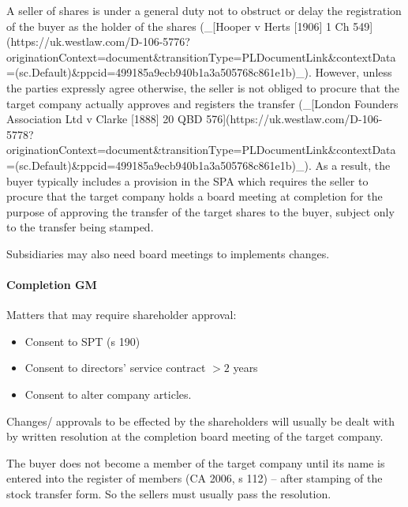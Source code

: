 \documentclass[
]{article}
\newenvironment{Shaded}{}{}
\newcommand{\NormalTok}[1]{#1}
\providecommand{\tightlist}{%
  \setlength{\itemsep}{0pt}\setlength{\parskip}{0pt}}
\begin{document}
\begin{Shaded}
\begin{Highlighting}[]
\NormalTok{A seller of shares is under a general duty not to obstruct or delay the registration of the buyer as the holder of the shares (\_[Hooper v Herts [1906] 1 Ch 549](https://uk.westlaw.com/D{-}106{-}5776?originationContext=document\&transitionType=PLDocumentLink\&contextData=(sc.Default)\&ppcid=499185a9ecb940b1a3a505768c861e1b)\_). However, unless the parties expressly agree otherwise, the seller is not obliged to procure that the target company actually approves and registers the transfer (\_[London Founders Association Ltd v Clarke [1888] 20 QBD 576](https://uk.westlaw.com/D{-}106{-}5778?originationContext=document\&transitionType=PLDocumentLink\&contextData=(sc.Default)\&ppcid=499185a9ecb940b1a3a505768c861e1b)\_). As a result, the buyer typically includes a provision in the SPA which requires the seller to procure that the target company holds a board meeting at completion for the purpose of approving the transfer of the target shares to the buyer, subject only to the transfer being stamped.}
\end{Highlighting}
\end{Shaded}

Subsidiaries may also need board meetings to implements changes.

\hypertarget{completion-gm}{%
\paragraph{Completion GM}\label{completion-gm}}

Matters that may require shareholder approval:

\begin{itemize}
\tightlist
\item
  Consent to SPT (s 190)
\item
  Consent to directors' service contract \(> 2\) years
\item
  Consent to alter company articles.
\end{itemize}

Changes/ approvals to be effected by the shareholders will usually be
dealt with by written resolution at the completion board meeting of the
target company.

\begin{Shaded}
\begin{Highlighting}[]
\NormalTok{The buyer does not become a member of the target company until its name is entered into the register of members (CA 2006, s 112) – after stamping of the stock transfer form. So the sellers must usually pass the resolution. }
\end{Highlighting}
\end{Shaded}
\end{document}
